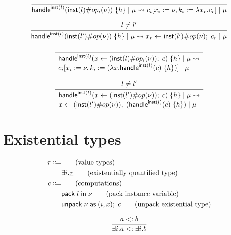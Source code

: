 \[\frac{
	\begin{array}{l}
	\end{array}
}{
	\mathsf{handle}^{\mathsf{inst}(l)} ( \mathsf{inst}(l) \# op_i(\nu) ) \; \{h\} \; | \; \mu \rightsquigarrow c_i[x_i := \nu, k_i := \lambda x_r . c_r] \; | \; \mu
}\]

\[\frac{
	\begin{array}{l}
	l \neq l'
	\end{array}
}{
	\mathsf{handle}^{\mathsf{inst}(l)} ( \mathsf{inst}(l') \# op(\nu) ) \; \{h\} \; | \; \mu \rightsquigarrow x_r \leftarrow \mathsf{inst}(l') \# op(\nu) ;\; c_r \; | \; \mu
}\]

\[\frac{
	\begin{array}{l}
	\end{array}
}{
	\begin{array}{l}
	\mathsf{handle}^{\mathsf{inst}(l)} ( x \leftarrow (\mathsf{inst}(l) \# op_i(\nu)) ;\; c ) \; \{h\} \; | \; \mu \rightsquigarrow \\
	c_i[x_i := \nu, k_i := (\lambda x . \mathsf{handle}^{\mathsf{inst}(l)} ( c ) \; \{h\})] \; | \; \mu
	\end{array}
}\]

\[\frac{
	\begin{array}{l}
	l \neq l'
	\end{array}
}{
	\begin{array}{l}
	\mathsf{handle}^{\mathsf{inst}(l)} ( x \leftarrow (\mathsf{inst}(l') \# op(\nu)) ;\; c ) \; \{h\} \; | \; \mu \rightsquigarrow \\
	x \leftarrow (\mathsf{inst}(l') \# op(\nu)) ;\; (\mathsf{handle}^{\mathsf{inst}(l)} ( c ) \; \{h\}) \; | \; \mu
	\end{array}
}\]

\section{Existential types}
\begin{align*}
	\tau \Coloneqq 	& 																	\tag{value types} \\
									& \exists i . \underline{\tau}									\tag{existentially quantified type}\\
	c \Coloneqq	&																		\tag{computations} \\
									& \mathsf{pack} \; l \; \mathsf{in} \; \nu									\tag{pack instance variable}\\
									& \mathsf{unpack} \; \nu \; \mathsf{as} \; ( i, x ) ;\; c				\tag{unpack existential type} \\
\end{align*}

\[
\frac{
	a <: b
}{
	\exists i . a <: \exists i . b
}
\]

